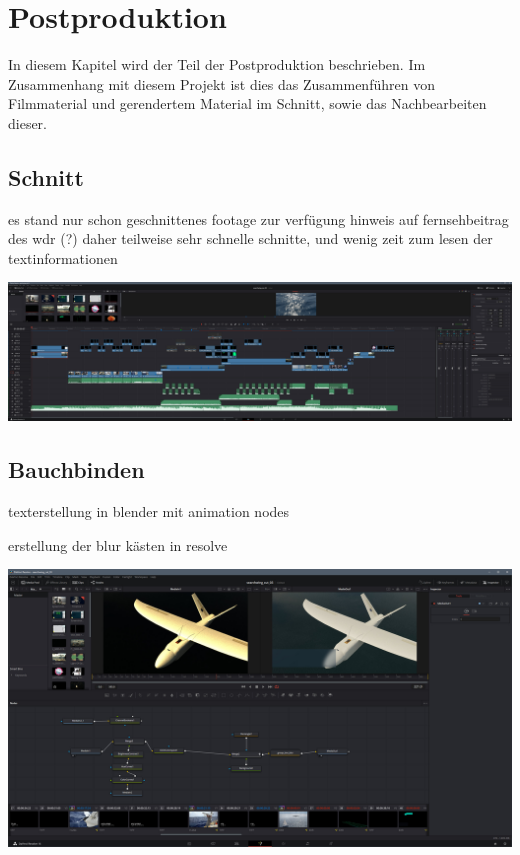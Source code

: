 \chapter{Postproduktion}

In diesem Kapitel wird der Teil der Postproduktion beschrieben. Im Zusammenhang mit diesem Projekt ist dies das Zusammenführen von Filmmaterial und gerendertem Material im Schnitt, sowie das Nachbearbeiten dieser.

\section{Schnitt}


es stand nur schon geschnittenes footage zur verfügung
hinweis auf fernsehbeitrag des wdr (?)
daher teilweise sehr schnelle schnitte, und wenig zeit zum lesen der textinformationen

\includegraphics[width=\textwidth]{gfx/post/resolve2.jpg}

\section{Bauchbinden}

texterstellung in blender mit animation nodes

erstellung der blur kästen in resolve

\includegraphics[width=\textwidth]{gfx/post/resolve3.jpg}

